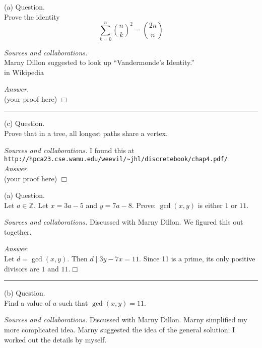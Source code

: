 \documentclass{amsart}
\newcommand{\zzz}{\mathbb Z}
\begin{document}
\vspace{0.6cm}

\newpage
\Large
{}      %

(a) Question. \\
Prove the identity
\begin{equation}
  \sum_{k=0}^n \binom{n}{k}^2 = \binom{2n}{n}
\end{equation}

\medskip\noindent
\emph{Sources and collaborations.}\\
Marny Dillon suggested to look up ``Vandermonde's Identity.''\\
in Wikipedia

\medskip\noindent
\emph{Answer.}\\
(your proof here) \hfill $\Box$

\bigskip\hrule

\vspace{0.5cm}

 (c)  Question.\\
Prove that in a tree, all longest paths share a vertex.

\medskip\noindent
\emph{Sources and collaborations.} 
I found this at\\
\verb<http://hpca23.cse.wamu.edu/weevil/~jhl/discretebook/chap4.pdf/<\\

\medskip\noindent
\emph{Answer.}\\
(your proof here)  \hfill $\Box$

\newpage
{}

 (a) Question.\\
Let $a\in \zzz$.  Let $x=3a-5$ and $y=7a-8$.  Prove:
$\gcd(x,y)$ is either $1$ or $11$.

\medskip\noindent
\emph{Sources and collaborations.} 
Discussed with Marny Dillon.  We figured this out together.

\medskip\noindent
\emph{Answer.}\\
Let $d=\gcd(x,y)$.  Then $d\mid 3y-7x = 11.$  Since 11 is a prime,
its only positive divisors are $1$ and $11$.\hfill $\Box$


\bigskip\hrule
\vspace{0.5cm}

(b) Question.\\
Find a value of $a$ such that $\gcd(x,y)=11$.

\medskip\noindent
\emph{Sources and collaborations.} 
Discussed with Marny Dillon.  Marny simplified my more
complicated idea.  Marny suggested the idea of the general
solution; I worked out the details by myself.
\end{document}
